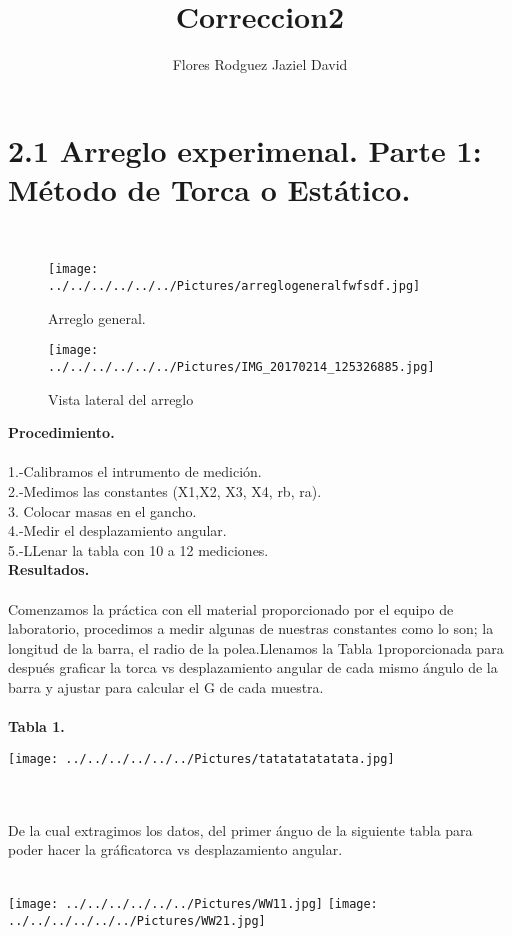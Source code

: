 \documentclass[10pt,a4paper]{article}
\author{Flores Rodguez Jaziel David }
\title{Correccion2}
\begin{document}
\section*{2.1 Arreglo experimenal. Parte 1: M\'{e}todo de Torca o Est\'{a}tico.} \\

\begin{figure}[hbtp]
\centering
\texttt{[image: ../../../../../../Pictures/arreglogeneralfwfsdf.jpg]} 
\caption{Arreglo general.}
\end{figure}

\begin{figure}[hbtp]
\centering
\texttt{[image: ../../../../../../Pictures/IMG\_20170214\_125326885.jpg]}  
\caption{Vista lateral del arreglo}
\end{figure}

\pagebreak 

\textbf{Procedimiento.}\\
\\
1.-Calibramos el intrumento de medici\'{o}n.\\
2.-Medimos las constantes (X1,X2, X3, X4, rb, ra).\\
3. Colocar masas en el gancho.\\
4.-Medir el desplazamiento angular.\\
5.-LLenar la tabla con 10 a 12 mediciones.\\

\textbf{Resultados.}\\
\\
Comenzamos la pr\'{a}ctica con ell material proporcionado por el equipo de laboratorio, procedimos a medir algunas de nuestras constantes como lo son; la longitud de la barra, el radio de la polea.Llenamos la Tabla 1proporcionada para despu\'{e}s graficar la torca vs desplazamiento angular de cada mismo \'{a}ngulo de la barra y ajustar para calcular el G de cada muestra.\\
\\
\medskip
\textbf{Tabla 1.}
\\
\begin{figure 2}
\centering
\texttt{[image: ../../../../../../Pictures/tatatatatatata.jpg]} 
\end{figure 2}
\\
\\
De la cual extragimos los datos, del primer \'{a}nguo de la siguiente tabla para poder hacer la gr\'{a}ficatorca vs desplazamiento angular.
\\
\begin{figure 3}
\centering
\caption{\textbf{Tabla 2.}  Datos tabulados para graficar.}
\\
\centering
\texttt{[image: ../../../../../../Pictures/WW11.jpg]}  
\texttt{[image: ../../../../../../Pictures/WW21.jpg]} 
\end{figure 3}
\\
\end{document}
